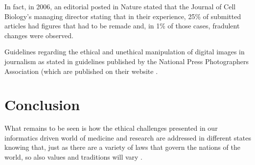 \documentclass[british,a4paper, 12pt]{article}
\begin{document}
In fact, in 2006, an editorial posted in Nature stated that the Journal of Cell Biology's
managing director stating that in their experience, 25\% of submitted articles had figures that
had to be remade and, in 1\% of those cases, fradulent changes were observed. %


Guidelines regarding the ethical and unethical manipulation of digital images in journalism as
stated in guidelines published by the National Press Photographers Association (which are
published on their website \parencite{national2012ethics}.






\section{Conclusion}

What remains to be seen is how the ethical challenges presented in our informatics driven
world of medicine and research are addressed in different states knowing that, just as there
are a variety of laws that govern the nations of the world, so also values and traditions will
vary \cite{kluge2000professional}.


\printbibliography
\end{document}
